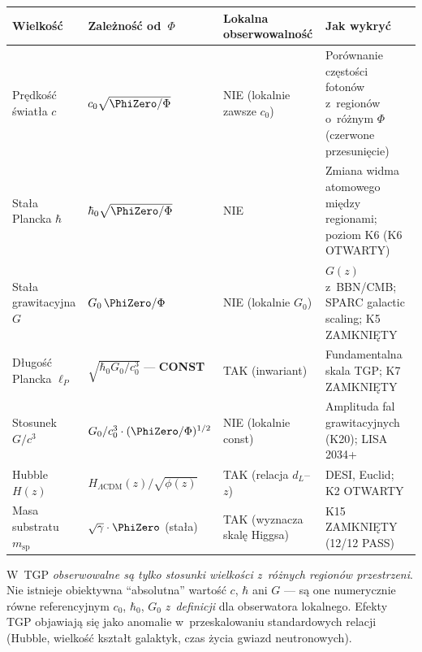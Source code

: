 \begin{center}
\small
\begin{tabular}{@{}p{3.2cm}p{2.8cm}p{2.5cm}p{5.5cm}@{}}
\toprule
\textbf{Wielko\'s\'c} & \textbf{Zale\.zno\'s\'c od~$\Phi$}
  & \textbf{Lokalna obserwowalno\'s\'c}
  & \textbf{Jak wykry\'c} \\
\midrule
Pr\k{e}dko\'s\'c \'swiat\l{}a $c$
  & $c_0\sqrt{\PhiZero/\Phi}$
  & NIE (lokalnie zawsze $c_0$)
  & Por\'ownanie cz\k{e}sto\'sci foton\'ow z~region\'ow
    o~r\'o\.znym $\Phi$ (czerwone przesuni\k{e}cie) \\
\midrule
Sta\l{}a Plancka $\hbar$
  & $\hbar_0\sqrt{\PhiZero/\Phi}$
  & NIE
  & Zmiana widma atomowego mi\k{e}dzy regionami;
    poziom K6 (K6 OTWARTY) \\
\midrule
Sta\l{}a grawitacyjna $G$
  & $G_0\,\PhiZero/\Phi$
  & NIE (lokalnie $G_0$)
  & $G(z)$ z~BBN/CMB; SPARC galactic scaling; K5 ZAMKNI\k{E}TY \\
\midrule
D\l{}ugo\'s\'c Plancka $\ell_P$
  & $\sqrt{\hbar_0 G_0/c_0^3}$ --- \textbf{CONST}
  & TAK (inwariant)
  & Fundamentalna skala TGP; K7 ZAMKNI\k{E}TY \\
\midrule
Stosunek $G/c^3$
  & $G_0/c_0^3 \cdot (\PhiZero/\Phi)^{1/2}$
  & NIE (lokalnie const)
  & Amplituda fal grawitacyjnych (K20); LISA 2034+ \\
\midrule
Hubble $H(z)$
  & $H_{\Lambda\mathrm{CDM}}(z)/\sqrt{\phi(z)}$
  & TAK (relacja $d_L$--$z$)
  & DESI, Euclid; K2 OTWARTY \\
\midrule
Masa substratu $m_{\mathrm{sp}}$
  & $\sqrt\gamma \cdot \PhiZero$ (sta\l{}a)
  & TAK (wyznacza skal\k{e} Higgsa)
  & K15 ZAMKNI\k{E}TY (12/12 PASS) \\
\bottomrule
\end{tabular}
\end{center}

\begin{remark}\label{rem:relacyjna}
  W~TGP \emph{obserwowalne s\k{a} tylko stosunki wielko\'sci z~r\'o\.znych
  region\'ow przestrzeni}.
  Nie istnieje obiektywna ``absolutna'' warto\'s\'c $c$, $\hbar$ ani $G$
  --- s\k{a} one numerycznie r\'owne referencyjnym $c_0$, $\hbar_0$, $G_0$
  \emph{z~definicji} dla obserwatora lokalnego. Efekty TGP objawiaj\k{a}
  si\k{e} jako anomalie w~przeskalowaniu standardowych relacji
  (Hubble, wielko\'s\'c kszta\l{}t galaktyk, czas \.zycia gwiazd neutronowych).
\end{remark}

